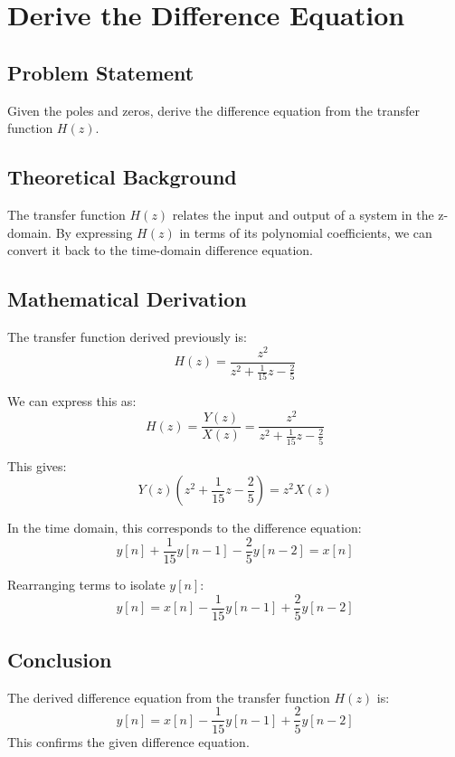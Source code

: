 \item[(f)]
\section{Derive the Difference Equation}

\subsection*{Problem Statement}
Given the poles and zeros, derive the difference equation from the transfer function \( H(z) \).

\subsection*{Theoretical Background}
The transfer function \( H(z) \) relates the input and output of a system in the z-domain. By expressing \( H(z) \) in terms of its polynomial coefficients, we can convert it back to the time-domain difference equation.

\subsection*{Mathematical Derivation}
The transfer function derived previously is:
\[ H(z) = \frac{z^2}{z^2 + \frac{1}{15} z - \frac{2}{5}} \]

We can express this as:
\[ H(z) = \frac{Y(z)}{X(z)} = \frac{z^2}{z^2 + \frac{1}{15} z - \frac{2}{5}} \]

This gives:
\[ Y(z) \left( z^2 + \frac{1}{15} z - \frac{2}{5} \right) = z^2 X(z) \]

In the time domain, this corresponds to the difference equation:
\[ y[n] + \frac{1}{15} y[n-1] - \frac{2}{5} y[n-2] = x[n] \]

Rearranging terms to isolate \( y[n] \):
\[ y[n] = x[n] - \frac{1}{15} y[n-1] + \frac{2}{5} y[n-2] \]

\subsection*{Conclusion}
The derived difference equation from the transfer function \( H(z) \) is:
\[ y[n] = x[n] - \frac{1}{15} y[n-1] + \frac{2}{5} y[n-2] \]
This confirms the given difference equation.
